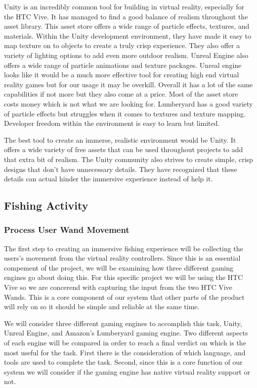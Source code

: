 \documentclass[10pt,journal,compsoc,onecolumn, draftclsnofoot]{IEEEtran}
\begin{document}
Unity is an incredibly common tool for building in virtual reality, especially for the HTC Vive.
It has managed to find a good balance of realism throughout the asset library.
This asset store offers a wide range of particle effects, textures, and materials.
Within the Unity development environment, they have made it easy to map texture on to objects to create a truly crisp experience.
They also offer a variety of lighting options to add even more outdoor realism.
Unreal Engine also offers a wide range of particle animations and texture packages.
Unreal engine looks like it would be a much more effective tool for creating high end virtual reality games but for our usage it may be overkill.
Overall it has a lot of the same capabilities if not more but they also come at a price.
Most of the asset store costs money which is not what we are looking for.
Lumberyard has a good variety of particle effects but struggles when it comes to textures and texture mapping.
Developer freedom within the environment is easy to learn but limited.

The best tool to create an immerse, realistic environment would be Unity.
It offers a wide variety of free assets that can be used throughout projects to add that extra bit of realism.
The Unity community also strives to create simple, crisp designs that don’t have unnecessary details.
They have recognized that these details can actual hinder the immersive experience instead of help it.
\vspace{2mm
}

\subsection{Fishing Activity}
\subsubsection{Process User Wand Movement}
The first step to creating an immersive fishing experience will be collecting the users's movement from the virtual reality controllers.
Since this is an essential compement of the project, we will be examining how three different gaming engines go about doing this.
For this specific project we will be using the HTC Vive so we are concerend with capturing the input from the two HTC Vive Wands.
This is a core component of our system that other parts of the product will rely on so it should be simple and reliable at the same time.

We will consider three different gaming engines to accomplish this task, Unity, Unreal Engine, and Amazon's Lumberyard gaming engine.
Two different aspects of each engine will be compared in order to reach a final verdict on which is the most useful for the task.
First there is the consideration of which language, and tools are used to complete the task.
Second, since this is a core function of our system we will consider if the gaming engine has native virtual reality support or not.
\end{document}
